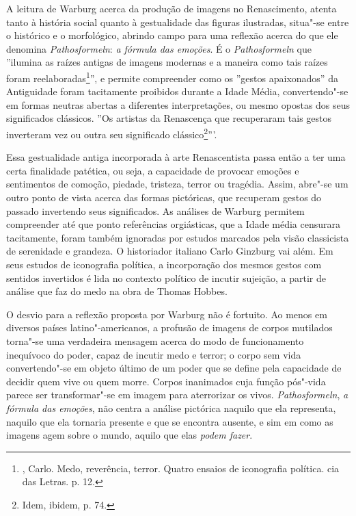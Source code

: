 A leitura de Warburg acerca da produção de imagens no Renascimento,
atenta tanto à história social quanto à gestualidade das figuras
ilustradas, situa"-se entre o histórico e o morfológico, abrindo campo
para uma reflexão acerca do que ele denomina \emph{Pathosformeln}:
\emph{a fórmula das emoções}. É o \emph{Pathosformeln} que ''ilumina as
raízes antigas de imagens modernas e a maneira como tais raízes foram
reelaboradas\footnote{, Carlo. Medo, reverência, terror. Quatro
  ensaios de iconografia política. cia das Letras. p. 12.}'', e permite
compreender como os ''gestos apaixonados'' da Antiguidade foram
tacitamente proibidos durante a Idade Média, convertendo"-se em formas
neutras abertas a diferentes interpretações, ou mesmo opostas dos seus
significados clássicos. ''Os artistas da Renascença que recuperaram tais
gestos inverteram vez ou outra seu significado clássico\footnote{Idem,
  ibidem, p. 74.}'''.

Essa gestualidade antiga incorporada à arte Renascentista passa então a
ter uma certa finalidade patética, ou seja, a capacidade de provocar
emoções e sentimentos de comoção, piedade, tristeza, terror ou tragédia.
Assim, abre"-se um outro ponto de vista acerca das formas pictóricas, que
recuperam gestos do passado invertendo seus significados. As análises de
Warburg permitem compreender até que ponto referências orgiásticas, que
a Idade média censurara tacitamente, foram também ignoradas por estudos
marcados pela visão classicista de serenidade e grandeza. O historiador
italiano Carlo Ginzburg vai além. Em seus estudos de iconografia
política, a incorporação dos mesmos gestos com sentidos invertidos é
lida no contexto político de incutir sujeição, a partir de análise que
faz do medo na obra de Thomas Hobbes.

O desvio para a reflexão proposta por Warburg não é fortuito. Ao menos
em diversos países latino"-americanos, a profusão de imagens de corpos
mutilados torna"-se uma verdadeira mensagem acerca do modo de
funcionamento inequívoco do poder, capaz de incutir medo e terror; o
corpo sem vida convertendo"-se em objeto último de um poder que se define
pela capacidade de decidir quem vive ou quem morre. Corpos inanimados
cuja função pós"-vida parece ser transformar"-se em imagem para
aterrorizar os vivos. \emph{Pathosformeln}, \emph{a fórmula das
emoções}, não centra a análise pictórica naquilo que ela representa,
naquilo que ela tornaria presente e que se encontra ausente, e sim em
como as imagens agem sobre o mundo, aquilo que elas \emph{podem fazer}.

